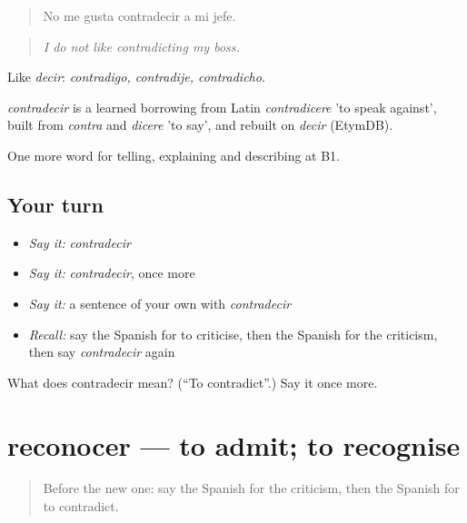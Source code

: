 \begin{quote}
No me gusta contradecir a mi jefe.
\end{quote}

\begin{quote}
\emph{I do not like contradicting my boss.}
\end{quote}

Like \emph{decir}: \emph{contradigo, contradije, contradicho}.

\begin{cousinweb}
\emph{contradecir} is a learned borrowing from Latin \emph{contradicere} 'to speak against', built from \emph{contra} and \emph{dicere} 'to say', and rebuilt on \emph{decir} (EtymDB).
\end{cousinweb}

\begin{grammarlens}[title={What you've built}]
One more word for telling, explaining and describing at B1.
\end{grammarlens}

\subsection*{Your turn}
\begin{itemize}
\raggedright
  \item \emph{Say it:} \emph{contradecir}
  \item \emph{Say it:} \emph{contradecir}, once more
  \item \emph{Say it:} a sentence of your own with \emph{contradecir}
  \item \emph{Recall:} say the Spanish for to criticise, then the Spanish for the criticism, then say \emph{contradecir} again
\end{itemize}

\begin{tcolorbox}[breakable,colback=teal!4,colframe=teal!35!black,title={Before you move on}]
What does contradecir mean? (\textquotedblleft{}To contradict\textquotedblright{}.) Say it once more.
\end{tcolorbox}
\section[reconocer]{reconocer — to admit; to recognise}

\label{lesson:ES-C579-reconocer}



\begin{quote}
Before the new one: say the Spanish for the criticism, then the Spanish for to contradict.
\end{quote}

